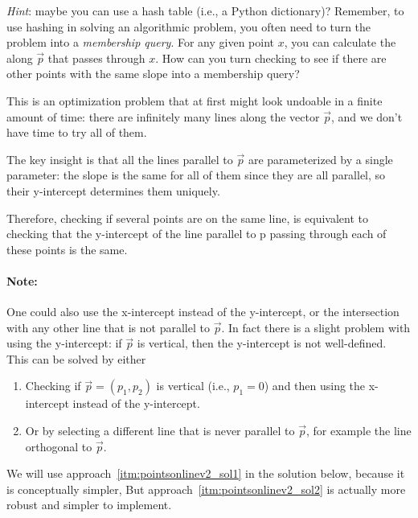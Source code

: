 \begin{prob}
    \emph{Hint}: maybe you can use a hash table (i.e., a Python dictionary)?
    Remember, to use hashing in solving an algorithmic problem, you often
    need to turn the problem into a \emph{membership query}. 
    For any given point $x$, you can calculate the along $\vec p$ 
    that passes through $x$.
    How can you turn checking to see if there are other points with the
    same slope into a membership query?

    \begin{soln}
        This is an optimization problem that at first might look undoable in a finite
        amount of time: there are infinitely many lines along the vector $\vec p$,
        and we don't have time to try all of them.

        The key insight is that all the lines parallel to $\vec p$ are parameterized by a single parameter: the slope is the same for all of them since they are all parallel, 
        so their y-intercept determines them uniquely.

        Therefore, checking if several points are on the same line, is equivalent to  checking that the y-intercept of the line parallel to p passing through each of these points is the same.

        \paragraph{Note:} One could also use the x-intercept instead of the y-intercept, or the intersection with any other line that is not parallel to $\vec p$. In fact there is a slight problem with using the y-intercept: if $\vec p$ is vertical, then the y-intercept is not well-defined. This can be solved by either
        \begin{enumerate}
            \item\label{itm:pointsonlinev2_sol1} Checking if $\vec p = (p_1, p_2)$ is vertical (i.e., $p_1 = 0$) and then using the x-intercept instead of the y-intercept.
            \item\label{itm:pointsonlinev2_sol2} Or by selecting a different line that is never parallel to $\vec p$, for example the line orthogonal to $\vec p$.
        \end{enumerate}

        We will use approach~\ref{itm:pointsonlinev2_sol1} in the solution below, 
        because it is conceptually simpler, 
        But approach~\ref{itm:pointsonlinev2_sol2} is actually more robust 
        and simpler to implement.
        

\end{soln}
\end{prob}
